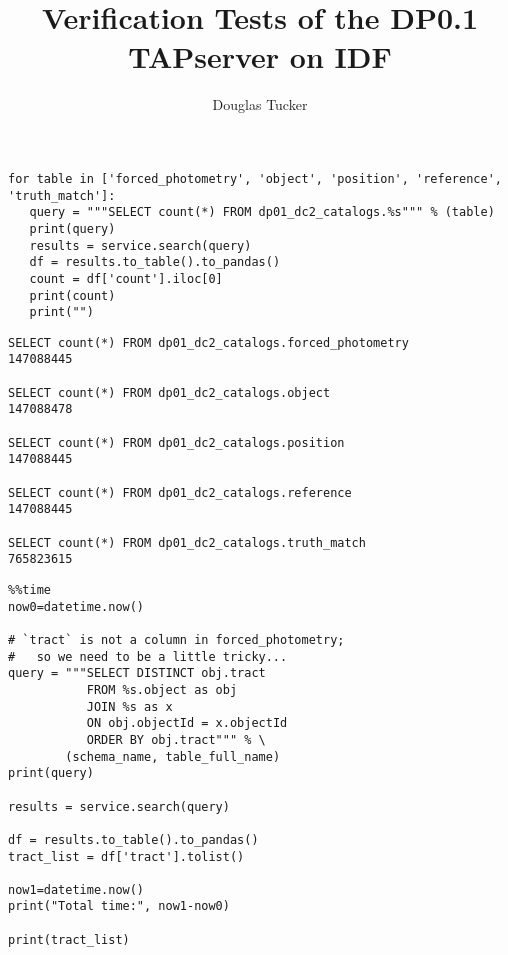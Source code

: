 \documentclass[DM,authoryear,toc]{lsstdoc}
\title{Verification Tests of the DP0.1 TAPserver on IDF}
\author{%
Douglas Tucker
}
\date{\vcsDate}
\begin{document}
\maketitle


\lstset{language=Python}
\begin{lstlisting}
for table in ['forced_photometry', 'object', 'position', 'reference', 'truth_match']:
   query = """SELECT count(*) FROM dp01_dc2_catalogs.%s""" % (table)
   print(query)
   results = service.search(query)
   df = results.to_table().to_pandas()
   count = df['count'].iloc[0]
   print(count)
   print("")
\end{lstlisting}

\lstset{language=SQL}
\begin{lstlisting}
SELECT count(*) FROM dp01_dc2_catalogs.forced_photometry
147088445

SELECT count(*) FROM dp01_dc2_catalogs.object
147088478

SELECT count(*) FROM dp01_dc2_catalogs.position
147088445
 
SELECT count(*) FROM dp01_dc2_catalogs.reference
147088445

SELECT count(*) FROM dp01_dc2_catalogs.truth_match
765823615
\end{lstlisting}


\lstset{language=Python}
\begin{lstlisting}
%%time
now0=datetime.now()

# `tract` is not a column in forced_photometry;
#   so we need to be a little tricky...
query = """SELECT DISTINCT obj.tract 
           FROM %s.object as obj
           JOIN %s as x
           ON obj.objectId = x.objectId  
           ORDER BY obj.tract""" % \
        (schema_name, table_full_name)
print(query)

results = service.search(query)

df = results.to_table().to_pandas()
tract_list = df['tract'].tolist()

now1=datetime.now()
print("Total time:", now1-now0)

print(tract_list)
\end{lstlisting}
\end{document}
